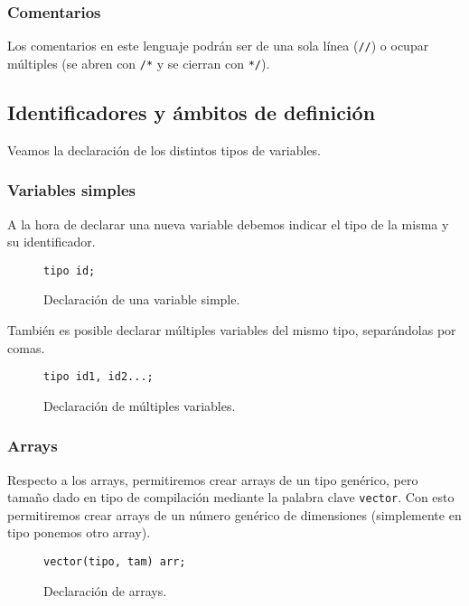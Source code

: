 \subsubsection{Comentarios}
Los comentarios en este lenguaje podrán ser de una sola línea (\lstinline{//}) o
ocupar múltiples (se abren con \lstinline{/*} y se cierran con \lstinline{*/}).

\subsection{Identificadores y ámbitos de definición}
Veamos la declaración de los distintos tipos de variables.
\subsubsection{Variables simples}
A la hora de declarar una nueva variable debemos indicar el tipo de la misma y
su identificador.
\begin{figure}[htbp]
    \centering
    \begin{lstlisting}
tipo id;
    \end{lstlisting}
    \caption{Declaración de una variable simple.}
\end{figure}
También es posible declarar múltiples variables del mismo tipo, separándolas por
comas.
\begin{figure}[htbp]
    \centering
    \begin{lstlisting}
tipo id1, id2...;
    \end{lstlisting}
    \caption{Declaración de múltiples variables.}
\end{figure}


\subsubsection{Arrays}
Respecto a los arrays, permitiremos crear arrays de un tipo genérico, pero
tamaño dado en tipo de compilación mediante la palabra clave \lstinline{vector}.
Con esto permitiremos crear arrays de un número genérico de dimensiones
(simplemente en tipo ponemos otro array).
\begin{figure}[htbp]
    \centering
    \begin{lstlisting}
vector(tipo, tam) arr;
    \end{lstlisting}
    \caption{Declaración de arrays.}
\end{figure}

